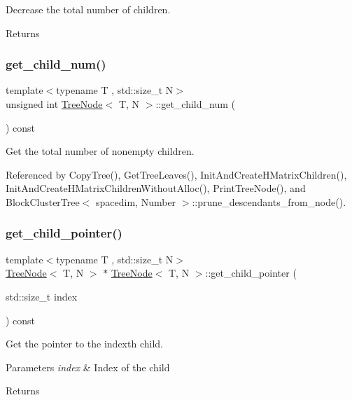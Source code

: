 Decrease the total number of children. \begin{DoxyReturn}{Returns}

\end{DoxyReturn}
\mbox{\label{classTreeNode_a077cb5cc974f94ff431c69cc2ca5957f}} 
\subsubsection{\texorpdfstring{get\+\_\+child\+\_\+num()}{get\_child\_num()}}
{\footnotesize\ttfamily template$<$typename T , std\+::size\+\_\+t N$>$ \\
unsigned int \hyperlink{classTreeNode}{Tree\+Node}$<$ T, N $>$\+::get\+\_\+child\+\_\+num (\begin{DoxyParamCaption}{ }\end{DoxyParamCaption}) const}

Get the total number of nonempty children. 

Referenced by Copy\+Tree(), Get\+Tree\+Leaves(), Init\+And\+Create\+H\+Matrix\+Children(), Init\+And\+Create\+H\+Matrix\+Children\+Without\+Alloc(), Print\+Tree\+Node(), and Block\+Cluster\+Tree$<$ spacedim, Number $>$\+::prune\+\_\+descendants\+\_\+from\+\_\+node().

\mbox{\label{classTreeNode_ad3b1833452c787d2146a4beb3587c531}} 
\subsubsection{\texorpdfstring{get\+\_\+child\+\_\+pointer()}{get\_child\_pointer()}}
{\footnotesize\ttfamily template$<$typename T , std\+::size\+\_\+t N$>$ \\
\hyperlink{classTreeNode}{Tree\+Node}$<$ T, N $>$ $\ast$ \hyperlink{classTreeNode}{Tree\+Node}$<$ T, N $>$\+::get\+\_\+child\+\_\+pointer (\begin{DoxyParamCaption}\item[{std\+::size\+\_\+t}]{index }\end{DoxyParamCaption}) const}

Get the pointer to the {\ttfamily index\textquotesingle{}th} child. 
\begin{DoxyParams}{Parameters}
{\em index} & Index of the child \\
\hline
\end{DoxyParams}
\begin{DoxyReturn}{Returns}

\end{DoxyReturn}


